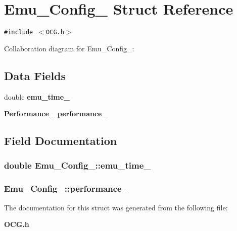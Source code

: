 \section{Emu\_\-Config\_\- Struct Reference}
\label{structEmu__Config__}
{\tt \#include $<$OCG.h$>$}

Collaboration diagram for Emu\_\-Config\_\-:\subsection*{Data Fields}
\begin{CompactItemize}
\item 
double {\bf emu\_\-time\_\-}
\item 
{\bf Performance\_\-} {\bf performance\_\-}
\end{CompactItemize}


\subsection{Field Documentation}
\subsubsection[{emu\_\-time\_\-}]{\setlength{\rightskip}{0pt plus 5cm}double {\bf Emu\_\-Config\_\-::emu\_\-time\_\-}}\label{structEmu__Config___d179f283bf943196ec5a04edad83fe02}


\subsubsection[{performance\_\-}]{ {\bf Emu\_\-Config\_\-::performance\_\-}}\label{structEmu__Config___61910b62229276340999b5aced0e310f}




The documentation for this struct was generated from the following file:\begin{CompactItemize}
\item 
{\bf OCG.h}\end{CompactItemize}
